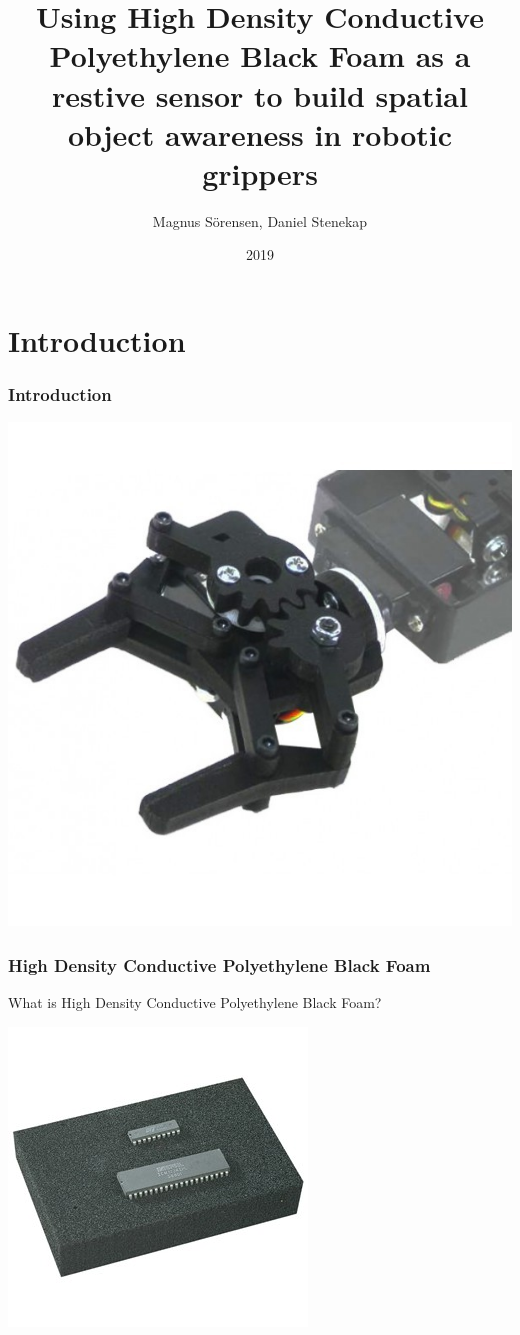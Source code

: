 \documentclass{beamer}
\title{Using High Density Conductive
Polyethylene Black Foam as a restive sensor to
build spatial object awareness in robotic grippers}
\author{Magnus Sörensen, Daniel Stenekap}
\institute{Märlardalens högskola}
\date{2019}
\begin{document}
\frame{\titlepage}


\begin{frame}
    \tableofcontents
\end{frame}

\section{Introduction}%
\label{sec:intro}

\begin{frame}
    \frametitle{Introduction}

    \begin{center}
        \includegraphics[width=.5\textwidth]{img/rob0078.jpg}
    \end{center}
\end{frame}

\begin{frame}
    \frametitle{High Density Conductive
Polyethylene Black Foam}
    What is High Density Conductive Polyethylene Black Foam?
    \begin{center}
        \includegraphics[width=.5\textwidth]{img/foam.jpg}
    \end{center}

\end{frame}
\end{document}
